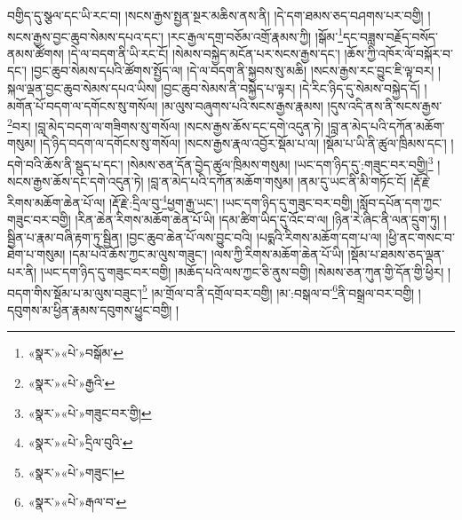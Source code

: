 བགྱིད་དུ་སྩལ་དང་ཡི་རང་བ། །སངས་རྒྱས་སྤྱན་སྔར་མཆིས་ནས་ནི། །དེ་དག་ཐམས་ཅད་བཤགས་པར་བགྱི། །སངས་རྒྱས་བྱང་ཆུབ་སེམས་དཔའ་དང་། །རང་རྒྱལ་དགྲ་བཅོམ་འགྲོ་རྣམས་ཀྱི། །སྒོམ་\footnote{«སྣར་»«པེ་»བསྒོམ་}དང་བཟླས་བརྗོད་བསོད་ནམས་ཚོགས། །དེ་ལ་བདག་ནི་ཡི་རང་ངོ། །སེམས་བསྐྱེད་མངོན་པར་སངས་རྒྱས་དང་། །ཆོས་ཀྱི་འཁོར་ལོ་བསྐོར་བ་དང་། །བྱང་ཆུབ་སེམས་དཔའི་ཚོགས་སྤྱོད་ལ། །དེ་ལ་བདག་ནི་སྐྱབས་སུ་མཆི། །སངས་རྒྱས་རང་བྱུང་ཇི་ལྟ་བར། །སྐལ་ལྡན་བྱང་ཆུབ་སེམས་དཔའ་ཡིས། །བྱང་ཆུབ་སེམས་ནི་བསྐྱེད་པ་ལྟར། །དེ་རིང་ཉིད་དུ་སེམས་བསྐྱེད་དོ། །མགོན་པོ་བདག་ལ་དགོངས་སུ་གསོལ། །མ་ལུས་བཞུགས་པའི་སངས་རྒྱས་རྣམས། །དུས་འདི་ནས་ནི་སངས་རྒྱས་\footnote{«སྣར་»«པེ་»རྒྱའི་}བར། །བླ་མེད་བདག་ལ་གཟིགས་སུ་གསོལ། །སངས་རྒྱས་ཆོས་དང་དགེ་འདུན་ཏེ། །བླ་ན་མེད་པའི་དཀོན་མཆོག་གསུམ། །དེ་ཉིད་བདག་ལ་དགོངས་སུ་གསོལ། །སངས་རྒྱས་རྣལ་འབྱོར་སྡོམ་པ་ལ། །སྡོམ་པ་ཡི་ནི་ཚུལ་ཁྲིམས་དང་། །དགེ་བའི་ཆོས་ནི་སྡུད་པ་དང་། །སེམས་ཅན་དོན་བྱེད་ཚུལ་ཁྲིམས་གསུམ། །ཡང་དག་ཉིད་དུ་:གཟུང་བར་བགྱི།\footnote{«སྣར་»«པེ་»གཟུང་བར་གྱི།} །སངས་རྒྱས་ཆོས་དང་དགེ་འདུན་ཏེ། །བླ་ན་མེད་པའི་དཀོན་མཆོག་གསུམ། །ནམ་དུ་ཡང་ནི་མི་གཏོང་ངོ། །རྡོ་རྗེ་རིགས་མཆོག་ཆེན་པོ་ལ། །རྡོ་རྗེ་:དྲིལ་བུ་\footnote{«སྣར་»«པེ་»དྲིལ་བུའི་}ཕྱག་རྒྱ་ཡང་། །ཡང་དག་ཉིད་དུ་གཟུང་བར་བགྱི། །སློབ་དཔོན་དག་ཀྱང་གཟུང་བར་བགྱི། །རིན་ཆེན་རིགས་མཆོག་ཆེན་པོ་ཡི། །དམ་ཚིག་ཡིད་དུ་འོང་བ་ལ། །ཉིན་རེ་ཞིང་ནི་ལན་དྲུག་ཏུ། །སྦྱིན་པ་རྣམ་བཞི་རྟག་ཏུ་སྦྱིན། །བྱང་ཆུབ་ཆེན་པོ་ལས་བྱུང་བའི། །པདྨའི་རིགས་མཆོག་དག་པ་ལ། །ཕྱི་ནང་གསང་བ་ཐེག་པ་གསུམ། །དམ་པའི་ཆོས་ཀྱང་མ་ལུས་གཟུང་། །ལས་ཀྱི་རིགས་མཆོག་ཆེན་པོ་ཡི། །སྡོམ་པ་ཐམས་ཅད་ལྡན་པར་ནི། །ཡང་དག་ཉིད་དུ་གཟུང་བར་བགྱི། །མཆོད་པའི་ལས་ཀྱང་ཅི་ནུས་བགྱི། །སེམས་ཅན་ཀུན་གྱི་དོན་གྱི་ཕྱིར། །བདག་གིས་སྡོམ་པ་མ་ལུས་བཟུང་།\footnote{«སྣར་»«པེ་»གཟུང་།} །མ་གྲོལ་བ་ནི་དགྲོལ་བར་བགྱི། །མ་:བསྒལ་བ་\footnote{«སྣར་»«པེ་»རྒལ་བ་}ནི་བསྒྲལ་བར་བགྱི། །དབུགས་མ་ཕྱིན་རྣམས་དབུགས་ཕྱུང་བགྱི། །
